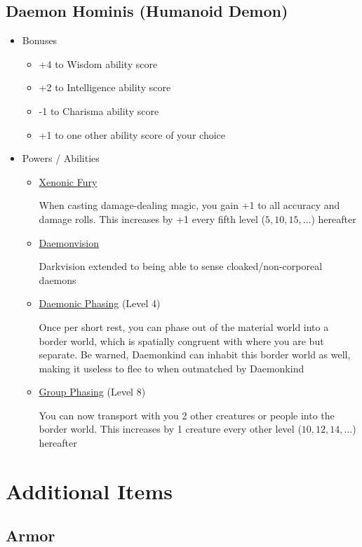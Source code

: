 \documentclass[12pt, landscape]{article}
\begin{document}
\begin{FlushLeft}
\begin{multicols}{2}
			\subsection{Daemon Hominis (Humanoid Demon)}
			\begin{itemize}[wide]
				\item Bonuses
				\begin{itemize}
					\item +4 to Wisdom ability score
					\item +2 to Intelligence ability score
					\item -1 to Charisma ability score
					\item +1 to one other ability score of your choice
				\end{itemize}
				\item Powers / Abilities
				\begin{itemize}
					\item \underline{Xenonic Fury}

					When casting damage-dealing magic, you gain +1 to all accuracy and damage rolls.
					This increases by +1 every fifth level ($5, 10, 15, \dots$) hereafter

					\item \underline{Daemonvision}

					Darkvision extended to being able to sense cloaked/non-corporeal daemons

					\item \underline{Daemonic Phasing} (Level 4)

					Once per short rest, you can phase out of the material world into a border world, which is spatially congruent with where you are but separate.
					Be warned, Daemonkind can inhabit this border world as well, making it useless to flee to when outmatched by Daemonkind

					\item \underline{Group Phasing} (Level 8)

					You can now transport with you 2 other creatures or people into the border world.
					This increases by 1 creature every other level ($10, 12, 14, \dots$) hereafter
				\end{itemize}
			\end{itemize}
			\vfill \pagebreak

			\section{Additional Items}
			\subsection{Armor}

\end{multicols}
\end{FlushLeft}
\end{document}
